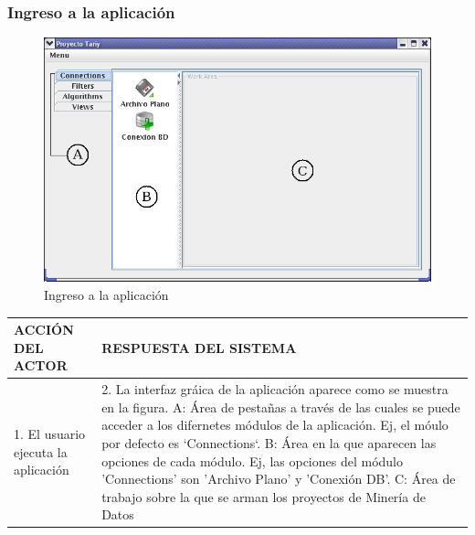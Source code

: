 \subsubsection{Ingreso a la aplicaci\'on}
\begin{figure}[ht]
\centering
\includegraphics[width=1\textwidth]{images/01.png}
\caption{Ingreso a la aplicaci\'on}
\end{figure}
\begin{center}
\begin{tabular}{|p{60mm}|p{60mm}|} \hline
ACCI\'ON DEL ACTOR & RESPUESTA DEL SISTEMA \\ \hline
1. El usuario ejecuta la aplicaci\'on & 2. La interfaz gr\'aica de la aplicaci\'on aparece como se muestra en la figura. A: \'Area de pesta\~nas a trav\'es de las cuales se puede acceder a los difernetes m\'odulos de la aplicaci\'on. Ej, el m\'oulo por defecto es `Connections`. B: \'Area en la que aparecen las opciones de cada m\'odulo. Ej, las opciones del m\'odulo 'Connections' son 'Archivo Plano' y 'Conexi\'on DB'.   C: \'Area de trabajo sobre la que se arman los proyectos de Miner\'ia de Datos\\ \hline
\end{tabular}
\end{center}
\newpage
